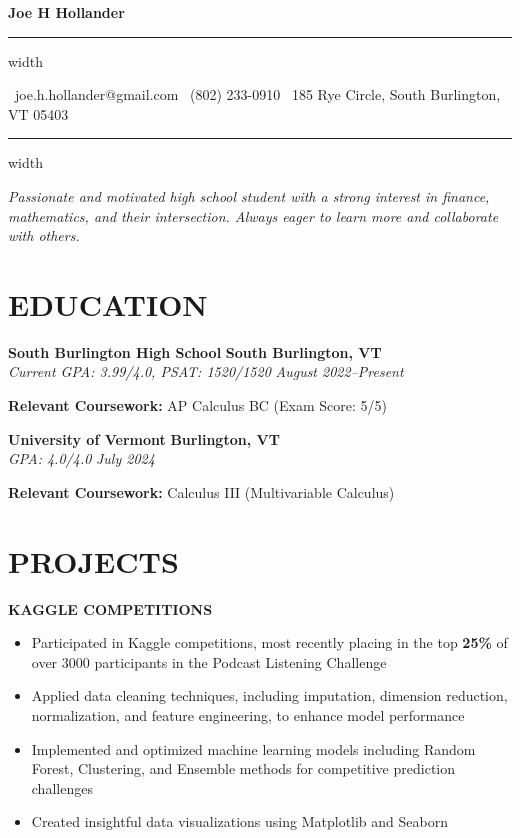 \documentclass[10pt,letterpaper]{article}
\newcommand{\name}[1]{
  \begin{center}
    \Huge\textbf{\color{headingcolor}#1}
  \end{center}
  \vspace{-0.5em}
  \hrule height 0.8pt width \textwidth
  \vspace{0.5em}
}
\newcommand{\contact}[3]{
  \begin{center}
    \faEnvelope\ #1 \hspace{1em} \faPhone\ #2 \hspace{1em} \faMapMarker*\ #3
  \end{center}
  \vspace{-0.5em}
  \hrule height 0.4pt width \textwidth
  \vspace{0.5em}
}
\newcommand{\role}[4]{
  \textbf{\color{subheadingcolor}#1} \hfill \textbf{#2} \\
  \textit{#3} \hfill \textit{#4}
}
\begin{document}
\name{Joe H Hollander}
\vspace{-0.25em}
\contact{joe.h.hollander@gmail.com}{(802) 233-0910}{185 Rye Circle, South Burlington, VT 05403}

\vspace{-0.25em}
\begin{center}
\textit{Passionate and motivated high school student with a strong interest in finance, mathematics, and their intersection.
Always eager to learn more and collaborate with others. }
\end{center}

\section{EDUCATION}

\vspace{0.5em}
\role{South Burlington High School}{South Burlington, VT}{Current GPA: 3.99/4.0, PSAT: 1520/1520}{August 2022--Present}   
\begin{flushleft}
\textbf{Relevant Coursework:} AP Calculus BC (Exam Score: 5/5)\\
\end{flushleft}

\vspace{0.5em}
\begin{flushleft}
\textbf{\color{subheadingcolor}University of Vermont} \hfill \textbf{Burlington, VT} \\
\textit{GPA: 4.0/4.0} \hfill \textit{July 2024}
\end{flushleft}
\begin{flushleft}
\textbf{Relevant Coursework:} Calculus III (Multivariable Calculus)\\
\end{flushleft}

\vspace{0.5em}
\section{PROJECTS}
\vspace{0.5em}

\begin{flushleft}
  \textbf{\color{subheadingcolor}KAGGLE COMPETITIONS}
  \begin{itemize}[leftmargin=*,nosep,itemsep=2pt]
      \item Participated in Kaggle competitions, most recently placing in the top \textbf{25\%} of over 3000 participants in the Podcast Listening Challenge
      \item Applied data cleaning techniques, including imputation, dimension reduction, normalization, and feature engineering, to enhance model performance
      \item Implemented and optimized machine learning models including Random Forest, Clustering, and Ensemble methods for competitive prediction challenges
      \item Created insightful data visualizations using Matplotlib and Seaborn
  \end{itemize}
  \end{flushleft}
  
\end{document}
